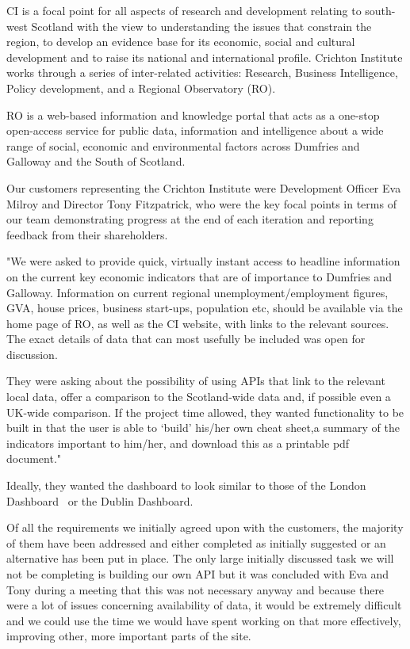 \documentclass{l3proj}
\begin{document}
CI is a focal point for all aspects of research and development relating to south-west Scotland with the view to understanding the
issues that constrain the region, to develop an evidence base for its economic, social and cultural development and to raise its
national and international profile. Crichton Institute works through a series of inter-related activities: Research,
Business Intelligence, Policy development, and a Regional Observatory (RO).

RO is a web-based information and knowledge portal that acts as a one-stop open-access service for public data, information and
intelligence about a wide range of social, economic and environmental factors across Dumfries and Galloway and the South of Scotland.

Our customers representing the Crichton Institute were Development Officer Eva Milroy and Director Tony Fitzpatrick, who were the key
focal points in terms of our team demonstrating progress at the end of each iteration and reporting feedback from their shareholders.


"We were asked to provide quick, virtually instant access to headline information on the current key economic indicators that are of
importance to Dumfries and Galloway. Information on current regional unemployment/employment figures, GVA, house prices, business start-ups,
population etc, should be available via the home page of RO, as well as the CI website, with links to the relevant sources.
The exact details of data that can most usefully be included was open for discussion.

They were asking about the possibility of using APIs that link to the relevant local data, offer a comparison to the Scotland-wide data and,
if possible even a UK-wide comparison. If the project time allowed, they wanted functionality to be built in that the user is able to ‘build’ his/her
own cheat sheet,a summary of the indicators important to him/her, and download this as a printable pdf document."

Ideally, they wanted the dashboard to look similar to those of the London Dashboard~\cite{LondonDashboard} or the Dublin Dashboard\cite{DublinDashboard}.


Of all the requirements we initially agreed upon with the customers, the majority of them have been addressed and either completed as initially suggested
or an alternative has been put in place. The only large initially discussed task we will not be completing is building our own API but it was concluded
with Eva and Tony during a meeting that this was not necessary anyway and because there were a lot of issues concerning availability of data, it would be
extremely difficult and we could use the time we would have spent working on that more effectively, improving other, more important parts of the site.
\end{document}
